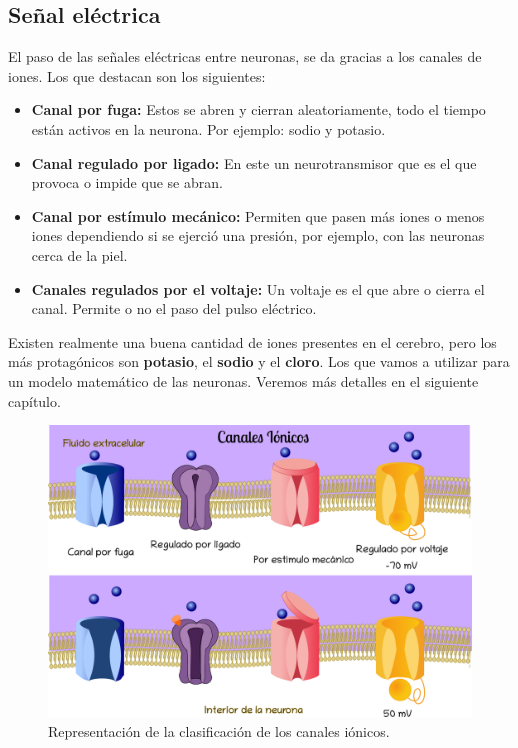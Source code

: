 







\subsection{Señal eléctrica}

El paso de las señales eléctricas entre neuronas, se da gracias a los canales de iones. Los que destacan son los siguientes:

\begin{itemize}
\item \textbf{Canal por fuga:} Estos se abren y cierran aleatoriamente, todo el tiempo están activos en la neurona. Por ejemplo: sodio y potasio.

\item \textbf{Canal regulado por ligado:} En este un neurotransmisor que es el que provoca o impide que se abran. 

\item  \textbf{Canal por estímulo mecánico:} Permiten que pasen más iones o menos iones dependiendo si se ejerció una presión, por ejemplo, con las neuronas cerca de la piel.
\item \textbf{Canales regulados por el voltaje:} Un voltaje es el que abre o cierra el canal. Permite o no el paso del pulso eléctrico. %
\end{itemize}


Existen realmente una buena cantidad de iones presentes en el cerebro, pero los más protagónicos son \textbf{potasio}, el \textbf{sodio} y el \textbf{cloro}. Los que vamos a utilizar para un modelo matemático de las neuronas. Veremos más detalles en el siguiente capítulo.


\begin{figure}[h]
 \centering
 \includegraphics[scale=0.28]{../Figuras/canalesIonicos.png}
 \caption{Representación de la clasificación de los canales iónicos.}
 \label{fig:MembranaP}
\end{figure}



